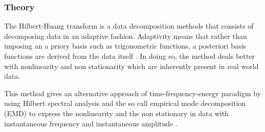 \documentclass[11pt, oneside]{article}   	%
\begin{document}
\subsubsection{Theory}
The Hilbert-Huang transform is a data decomposition methods that consists of decomposing data in an adaptive fashion. Adaptivity means that rather than imposing an a priory basis such as trigonometric functions, a posteriori basis functions are derived from the data itself \cite{norden2008}. In doing so, the method deals better with nonlinearity and non stationarity which are inherently present in real world data.

\begin{flushleft}
This method gives an alternative approach of time-frequency-energy paradigm by using Hilbert spectral analysis and the so call empirical mode decomposition (EMD) to express the nonlinearity and the non stationary in data 
with instantaneous frequency and instantaneous amplitude \cite{norden2008}.
\end{flushleft}
\end{document}
